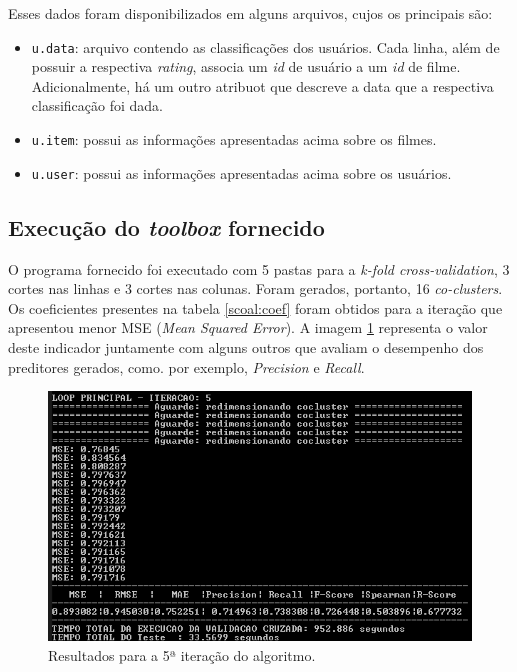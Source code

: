 \vspace{12pt}

Esses dados foram disponibilizados em alguns arquivos, cujos os principais são:

\begin{itemize}
  \item \texttt{u.data}: arquivo contendo as classificações dos usuários. Cada
  linha, além de possuir a respectiva \textit{rating}, associa um \textit{id} de
  usuário a um \textit{id} de filme. Adicionalmente, há um outro atribuot que
  descreve a data que a respectiva classificação foi dada.

  \item \texttt{u.item}: possui as informações apresentadas acima sobre os
  filmes.
  
  \item \texttt{u.user}: possui as informações apresentadas acima sobre os
  usuários.
  
\end{itemize}

\subsection{Execução do \textit{toolbox} fornecido}

O programa fornecido foi executado com 5 pastas para a \textit{k-fold
cross-validation}, 3 cortes nas linhas e 3 cortes nas colunas.
Foram gerados, portanto, 16 \textit{co-clusters}. Os coeficientes presentes na
tabela \ref{scoal:coef} foram obtidos para a iteração que apresentou menor MSE
(\textit{Mean Squared Error}). A imagem \ref{fig:scoal_result} representa o
valor deste indicador juntamente com alguns outros que avaliam o desempenho dos
preditores gerados, como. por exemplo, \textit{Precision} e \textit{Recall}. 

\FloatBarrier
	
	\begin{figure}[h]
    \centering
    \includegraphics[scale=0.65]{scoal/execucaoScoal}
    \caption{\label{fig:scoal_result}Resultados para a 5ª iteração do
    algoritmo.}
	\end{figure}  
	
